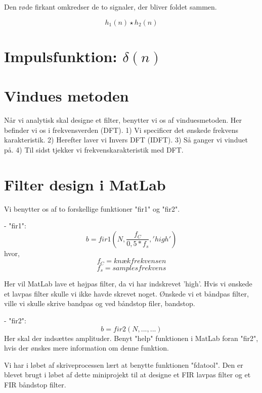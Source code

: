 \documentclass[12pt, letterpaper]{article}
\begin{document}
Den røde firkant omkredser de to signaler, der bliver foldet sammen. 

$$ h_1(n)\star h_2(n) $$


\section{Impulsfunktion: $\delta(n)$}


\section{Vindues metoden}
Når vi analytisk skal designe et filter, benytter vi os af vinduesmetoden. Her befinder vi os i frekvensverden (DFT). 
1) Vi specificer det ønskede frekvens karakteristik.
2) Herefter laver vi Invers DFT (IDFT). 
3) Så ganger vi vinduet på. 
4) Til sidst tjekker vi frekvenskarakteristik med DFT. 
 
\section{Filter design i MatLab}
Vi benytter os af to forskellige funktioner "fir1" og "fir2". 

- "fir1": 
$$ b = fir1(N, \frac{f_C}{0,5*f_s}, 'high') $$ 
hvor, 
$$ f_C = knækfrekvensen $$
$$ f_s = samplesfrekvens $$

Her vil MatLab lave et højpas filter, da vi har indskrevet 'high'. 
Hvis vi ønskede et lavpas filter skulle vi ikke havde skrevet noget. Ønskede vi et båndpas filter, ville vi skulle skrive bandpas og ved båndstop filer, bandstop. 

- "fir2": 
$$ b = fir2(N, ..., ...) $$
Her skal der indsættes amplituder. Benyt "help" funktionen i MatLab foran "fir2", hvis der ønskes mere information om denne funktion. 

Vi har i løbet af skriveprocessen lært at benytte funktionen "fdatool". Den er blevet brugt i løbet af dette miniprojekt til at designe et FIR lavpas filter og et FIR båndstop filter. 
\end{document}
